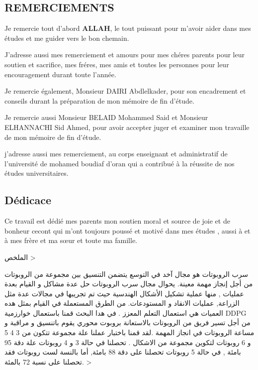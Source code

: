 \documentclass[12pt]{extarticle}
\begin{document}
\begin{titlepage}



\end{titlepage}

\begin{center}
\begin{doublespace}
\subsection*{REMERCIEMENTS}
Je remercie tout d'abord \textbf{ALLAH}, le tout puissant pour m'avoir aider dans mes études et me guider vers le bon chemain.

J'adresse aussi mes remerciement et amours pour mes chéres parents pour  leur soutien et sacrifice, mes fréres, mes amis et toutes les personnes pour leur encouragement durant toute l'année.

Je remercie également, Monsieur DAIRI Abdlelkader, pour son encadrement et conseils durant la préparation de mon mémoire de fin d'étude.

Je remercie aussi Monsieur BELAID Mohammed Said et Monsieur ELHANNACHI Sid Ahmed, pour avoir accepter juger et examiner mon travaille de mon mémoire de fin d'étude.
 
j'adresse aussi  mes remerciement, au corps  enseignant et
administratif de l’université de mohamed boudiaf d'oran qui a contribué à la réussite de nos études universitaires.
 
 
 \subsection*{Dédicace}
Ce travail est dédié mes parents mon soutien moral et source de joie et de bonheur cecont qui m’ont toujours poussé et motivé dans mes études , aussi à et à mes frère et ma sœur et toute ma famille.
 
 
 
\end{doublespace}
\end{center}
\pagebreak
\begin{RLtext}

\<الملخص   >

\<سرب الروبوتات هو مجال آخد في التوسع يتضمن التنسيق بين مجموعة من الروبوتات من أجل إنجاز مهمة معينة. يحوال مجال سرب الروبوتات حل عدة مشاكل و القيام بعدة عمليات , منها عملية تشكيل الأشكال الهندسية  حيث تم تجريبها في مجالات عدة مثل الزراعة, عمليات الانقاد و المستودعات. من الطرق المستعملة في القيام بمثل هده العميات هي استعمال التعلم المعزز . في هدا البحث قمنا باستعمال خوارزمية DDPG  من أجل  تسير فريق من الروبوتات بالاستعانة بروبوت محوري يقوم باتنسيق و مراقبة و مساعة الروبوتات في انجاز المهمة .لقد قمنا باختبار عملنا علة مجموعة تتكون من 3 4 5 و 6 روبوتات لتكوين مجموعة من الاشكال . تحصلنا في حالة 3 و 4 روبوتات علة دقة 95 بامئة , في حالة 5 روبوتات تحصلنا على دقة 88 بامئة, أما بالنسة لست روبوتات فقد تحصلنا على نسبة 72 بالمئة.      >
\end{RLtext}
\end{document}
